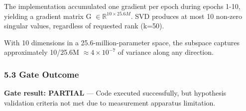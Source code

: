 The implementation accumulated one gradient per epoch during epochs 1-10, yielding a gradient matrix G $\in \mathbb{R}^{10\times 25.6M}$. SVD produces at most 10 non-zero singular values, regardless of requested rank (k=50).

With 10 dimensions in a 25.6-million-parameter space, the subspace captures approximately 10/25.6M $\approx 4\times 10^{-7}$ of variance along any direction.

\subsubsection{5.3 Gate Outcome}

\begin{table}[htbp]
\centering
{}
\end{table}

\textbf{Gate result: PARTIAL} --- Code executed successfully, but hypothesis validation criteria not met due to measurement apparatus limitation.


